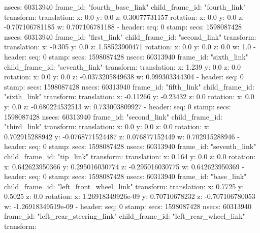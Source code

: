         nsecs:  60313940
      frame_id: "fourth_base_link"
    child_frame_id: "fourth_link"
    transform: 
      translation: 
        x: 0.0
        y: 0.0
        z: 0.30077731157
      rotation: 
        x: 0.0
        y: 0.0
        z: -0.707106781185
        w: 0.707106781188
  - 
    header: 
      seq: 0
      stamp: 
        secs: 1598087428
        nsecs:  60313940
      frame_id: "first_link"
    child_frame_id: "second_link"
    transform: 
      translation: 
        x: -0.305
        y: 0.0
        z: 1.58523900471
      rotation: 
        x: 0.0
        y: 0.0
        z: 0.0
        w: 1.0
  - 
    header: 
      seq: 0
      stamp: 
        secs: 1598087428
        nsecs:  60313940
      frame_id: "sixth_link"
    child_frame_id: "seventh_link"
    transform: 
      translation: 
        x: 1.239
        y: 0.0
        z: 0.0
      rotation: 
        x: 0.0
        y: 0.0
        z: -0.0373205849638
        w: 0.999303344304
  - 
    header: 
      seq: 0
      stamp: 
        secs: 1598087428
        nsecs:  60313940
      frame_id: "fifth_link"
    child_frame_id: "sixth_link"
    transform: 
      translation: 
        x: -0.11266
        y: -0.23432
        z: 0.0
      rotation: 
        x: 0.0
        y: 0.0
        z: -0.680224532513
        w: 0.733003809927
  - 
    header: 
      seq: 0
      stamp: 
        secs: 1598087428
        nsecs:  60313940
      frame_id: "second_link"
    child_frame_id: "third_link"
    transform: 
      translation: 
        x: 0.0
        y: 0.0
        z: 0.0
      rotation: 
        x: 0.702915288942
        y: -0.0768771524487
        z: 0.076877152449
        w: 0.702915288946
  - 
    header: 
      seq: 0
      stamp: 
        secs: 1598087428
        nsecs:  60313940
      frame_id: "seventh_link"
    child_frame_id: "tip_link"
    transform: 
      translation: 
        x: 0.164
        y: 0.0
        z: 0.0
      rotation: 
        x: 0.642623950366
        y: 0.295016030774
        z: -0.295016030775
        w: 0.642623950369
  - 
    header: 
      seq: 0
      stamp: 
        secs: 1598087428
        nsecs:  60313940
      frame_id: "base_link"
    child_frame_id: "left_front_wheel_link"
    transform: 
      translation: 
        x: 0.7725
        y: 0.5025
        z: 0.0
      rotation: 
        x: 1.26918349926e-09
        y: 0.70710678232
        z: -0.707106780053
        w: -1.26918349519e-09
  - 
    header: 
      seq: 0
      stamp: 
        secs: 1598087428
        nsecs:  60313940
      frame_id: "left_rear_steering_link"
    child_frame_id: "left_rear_wheel_link"
    transform: 
